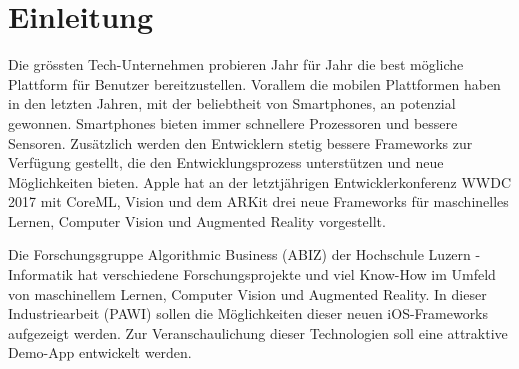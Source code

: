 \section{Einleitung}




Die grössten Tech-Unternehmen probieren Jahr für Jahr die best mögliche Plattform für Benutzer bereitzustellen. Vorallem die mobilen Plattformen haben in den letzten Jahren, mit der beliebtheit von Smartphones, an potenzial gewonnen. Smartphones bieten immer schnellere Prozessoren und bessere Sensoren. Zusätzlich werden den Entwicklern stetig bessere Frameworks zur Verfügung gestellt, die den Entwicklungsprozess unterstützen und neue Möglichkeiten bieten. Apple hat an der letztjährigen Entwicklerkonferenz WWDC 2017 mit CoreML, Vision und dem ARKit drei neue Frameworks für maschinelles Lernen, Computer Vision und Augmented Reality vorgestellt.



Die Forschungsgruppe Algorithmic Business (ABIZ) der Hochschule Luzern - Informatik hat verschiedene Forschungsprojekte und viel Know-How im Umfeld von maschinellem Lernen, Computer Vision und Augmented Reality. In dieser Industriearbeit (PAWI) sollen die Möglichkeiten dieser neuen iOS-Frameworks aufgezeigt werden. Zur Veranschaulichung dieser Technologien soll eine attraktive Demo-App entwickelt werden. 


